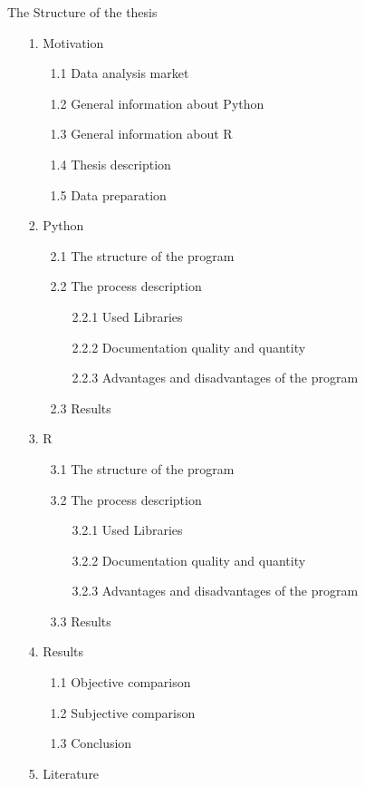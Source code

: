 \documentclass [twoside,
  11pt, a4paper,
  footinclude=true,
  headinclude=true,
  cleardoublepage=empty
]{article}
\begin{document}
The Structure of the thesis
\begin{enumerate}
    \item[1.] Motivation
        \begin{enumerate}
            \item[1.1] Data analysis market
            \item[1.2] General information about Python 
            \item[1.3] General information about R
            \item[1.4] Thesis description
            \item[1.5] Data preparation 
        \end{enumerate}
    \item[2.] Python
        \begin{enumerate}
            \item[2.1] The structure of the program
            \item[2.2] The process description
            \begin{enumerate}
                \item[2.2.1] Used Libraries
                \item[2.2.2] Documentation quality and quantity
                \item[2.2.3] Advantages and disadvantages of the program 
            \end{enumerate}
            \item[2.3] Results
        \end{enumerate}
    \item[3.] R
        \begin{enumerate}
            \item[3.1] The structure of the program
            \item[3.2] The process description
            \begin{enumerate}
                \item[3.2.1] Used Libraries
                \item[3.2.2] Documentation quality and quantity
                \item[3.2.3] Advantages and disadvantages of the program 
            \end{enumerate}
            \item[3.3] Results
        \end{enumerate}
    \item[4.] Results
        \begin{enumerate}
            \item[1.1] Objective comparison
            \item[1.2] Subjective comparison
            \item[1.3] Conclusion
        \end{enumerate}
    \item[5.] Literature
\end{enumerate}
\end{document}
